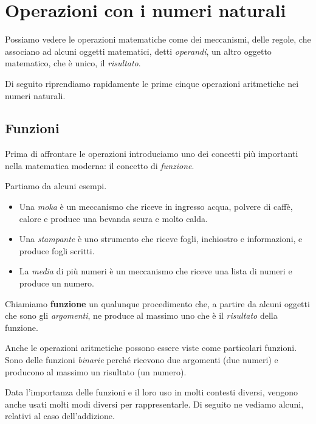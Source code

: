 \section{Operazioni con i numeri naturali}
\label{sec:nat_operazioni}

Possiamo vedere le operazioni matematiche come 
dei meccanismi, delle regole, 
che associano ad alcuni oggetti matematici, detti \emph{operandi}, 
un altro oggetto matematico, che è unico, il \emph{risultato}.

Di seguito riprendiamo rapidamente le prime cinque operazioni aritmetiche 
nei numeri naturali. 

\subsection{Funzioni}

Prima di affrontare le operazioni introduciamo uno dei concetti più 
importanti nella matematica moderna: il concetto di 
\emph{funzione}.

\begin{esempi}{}{}
Partiamo da alcuni esempi.
\begin{itemize} [noitemsep]
\item Una \emph{moka} è un meccanismo che riceve in ingresso acqua, 
polvere di caffè, calore e produce una bevanda scura e molto calda.
\item Una \emph{stampante} è uno strumento che riceve fogli, 
inchiostro e informazioni, e produce fogli scritti.
\item La \emph{media} di più numeri è un meccanismo che riceve una 
lista di numeri e produce un numero.
\end{itemize}
\end{esempi}

\begin{definizione}{}{}
Chiamiamo \textbf{funzione} un qualunque procedimento che, 
a partire da alcuni oggetti che sono gli \emph{argomenti}, 
ne produce al massimo uno che è il \emph{risultato} della funzione.
\end{definizione}

Anche le operazioni aritmetiche possono essere viste come particolari
funzioni. 
Sono delle funzioni \emph{binarie} perché 
ricevono due argomenti (due numeri) e producono al massimo un risultato 
(un numero).

Data l'importanza delle funzioni e il loro uso in molti contesti diversi, 
vengono anche usati molti modi diversi per 
rappresentarle. 
Di seguito ne vediamo alcuni, relativi al caso dell'addizione.

